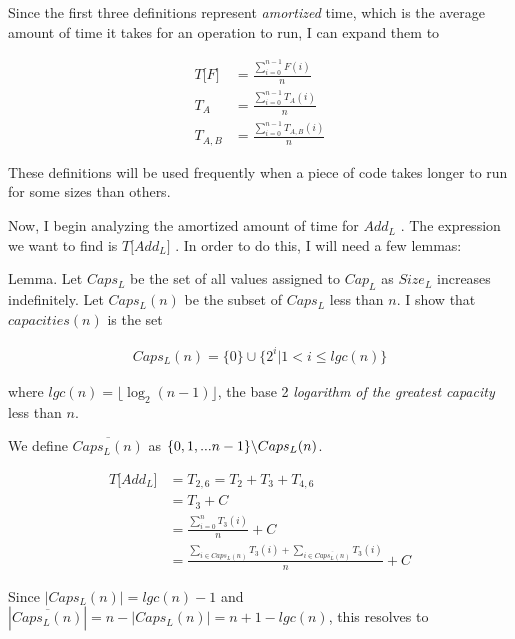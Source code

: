 \documentclass{article}
\newcommand{\size}{
	\ensuremath{Size_L}
}
\newcommand{\capacity}{
	\ensuremath{Cap_L}
}
\newcommand{\addfn}{
	\ensuremath{Add_L}
}
\newcommand{\timeof}[1]{
	\ensuremath{T\big[#1\big]}
}
\newcommand{\capacities}{
	\ensuremath{Caps_L}
}
\begin{document}
	Since the first three definitions represent \textit{amortized} time, which is the average amount of time it takes for an operation to run, I can expand them to
	
	\begin{align*}
	\timeof{F} &= \frac {\sum_{i = 0}^{n - 1} F(i)} n\\
	T_A &= \frac {\sum_{i = 0}^{n - 1} T_A(i)} n\\
	T_{A,B} &= \frac {\sum_{i = 0}^{n - 1} T_{A,B}(i)} n
	\end{align*}
	
	
	These definitions will be used frequently when a piece of code takes longer to run for some sizes than others.
	
	Now, I begin analyzing the amortized amount of time for \addfn. The expression we want to find is \timeof{\addfn}. In order to do this, I will need a few lemmas:
	
	Lemma. Let \capacities be the set of all values assigned to \capacity as \size increases indefinitely. Let $\capacities(n)$ be the subset of \capacities less than $n$. I show that $capacities(n)$ is the set
	
	\begin{align*}
	\capacities(n) = \{0\} \cup \{2^i | 1 < i \leq lgc(n) \}
	\end{align*}
	
	where $lgc(n) = \lfloor \log_2{(n - 1)} \rfloor$, the base 2 \textit{logarithm of the greatest capacity} less than $n$.
	
	
	We define $\overline{\capacities(n)}$ as $\{0, 1, ... n - 1\} \char`\\ \capacities(n)$.
	
	\begin{align*}
	\timeof{\addfn} &= T_{2,6} = T_2 + T_3 + T_{4,6}\\
	&= T_3 + C\\
	&= \frac {\sum_{i = 0}^n T_3(i)} n + C\\
	&= \frac {\sum_{i \in \capacities(n)} T_3(i) + \sum_{i \in \overline{\capacities(n)}} T_3(i)} n + C
	\end{align*}
	
	Since $|\capacities(n)| = lgc(n) - 1$ and $|\overline{\capacities(n)}| = n - |\capacities(n)| = n + 1 - lgc(n)$, this resolves to
	
\end{document}
